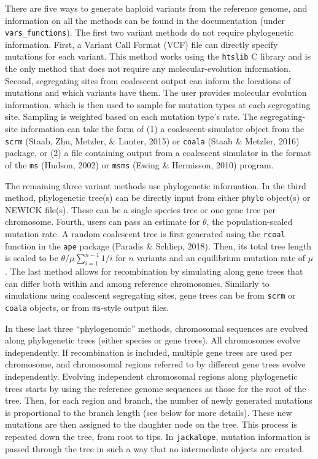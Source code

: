 \documentclass[12pt,]{article}
\begin{document}
There are five ways to generate haploid variants from the reference genome, and
information on all the methods can be found in the documentation (under \texttt{vars\_functions}).
The first two variant methods do not require phylogenetic information.
First, a Variant Call Format (VCF) file can directly specify mutations for each variant.
This method works using the \texttt{htslib} C library and
is the only method that does not require any molecular-evolution information.
Second, segregating sites from coalescent output can inform the locations of mutations
and which variants have them.
The user provides molecular evolution information, which is then used to sample
for mutation types at each segregating site.
Sampling is weighted based on each mutation type's rate.
The segregating-site information can take the form of
(1) a coalescent-simulator object from the \texttt{scrm}
(Staab, Zhu, Metzler, \& Lunter, 2015) or
\texttt{coala} (Staab \& Metzler, 2016) package, or
(2) a file containing output from a coalescent simulator in the format of the
\texttt{ms} (Hudson, 2002) or \texttt{msms} (Ewing \& Hermisson, 2010) program.

The remaining three variant methods use phylogenetic information.
In the third method, phylogenetic tree(s) can be directly input from either
\texttt{phylo} object(s) or NEWICK file(s).
These can be a single species tree or one gene tree per chromosome.
Fourth, users can pass an estimate for \(\theta\), the population-scaled mutation rate.
A random coalescent tree is first generated using the \texttt{rcoal} function
in the \texttt{ape} package (Paradis \& Schliep, 2018).
Then, its total tree length is scaled to be
\(\theta / \mu \sum_{i=1}^{n-1}{1 / i}\) for \(n\) variants and an equilibrium
mutation rate of \(\mu\).
The last method allows for recombination by simulating along
gene trees that can differ both within and among reference chromosomes.
Similarly to simulations using coalescent segregating sites, gene trees can be
from \texttt{scrm} or \texttt{coala} objects, or from \texttt{ms}-style output files.

In these last three ``phylogenomic'' methods, chromosomal sequences are evolved along
phylogenetic trees (either species or gene trees).
All chromosomes evolve independently.
If recombination is included, multiple gene trees are used
per chromosome, and chromosomal regions referred to by different gene trees
evolve independently.
Evolving independent chromosomal regions along phylogenetic trees starts by
using the reference genome sequences as those for the root of the tree.
Then, for each region and branch, the number of newly generated mutations is
proportional to the branch length (see below for more details).
These new mutations are then assigned to the daughter node on the tree.
This process is repeated down the tree, from root to tips.
In \texttt{jackalope}, mutation information is passed through the tree in such a
way that no intermediate objects are created.
\end{document}
